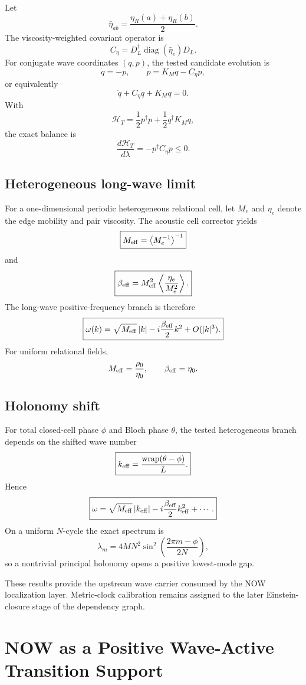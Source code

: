 \documentclass[11pt]{book}
\begin{document}
Let
\[
\bar\eta_{ab}=\frac{\eta_R(a)+\eta_R(b)}2.
\]
The viscosity-weighted covariant operator is
\[
\boxed{
C_\eta
=D_L^\dagger\operatorname{diag}(\bar\eta_e)D_L.
}
\]
For conjugate wave coordinates $(q,p)$, the tested candidate evolution is
\[
\dot q=-p,
\qquad
\dot p=K_Mq-C_\eta p,
\]
or equivalently
\[
\boxed{
\ddot q+C_\eta\dot q+K_Mq=0.
}
\]
With
\[
\mathcal H_T
=\frac12p^\dagger p+\frac12q^\dagger K_Mq,
\]
the exact balance is
\[
\boxed{
\frac{d\mathcal H_T}{d\lambda}
=-p^\dagger C_\eta p\le0.
}
\]

\section{Heterogeneous long-wave limit}

For a one-dimensional periodic heterogeneous relational cell, let $M_e$ and $\eta_e$ denote the edge mobility and pair viscosity.  The acoustic cell corrector yields
\[
\boxed{
M_{\rm eff}
=\left\langle M_e^{-1}\right\rangle^{-1}
}
\]
and
\[
\boxed{
\beta_{\rm eff}
=M_{\rm eff}^2
\left\langle\frac{\eta_e}{M_e^2}\right\rangle.
}
\]
The long-wave positive-frequency branch is therefore
\[
\boxed{
\omega(k)
=\sqrt{M_{\rm eff}}\,|k|
-i\frac{\beta_{\rm eff}}2k^2
+O(|k|^3).
}
\]
For uniform relational fields,
\[
M_{\rm eff}=\frac{\rho_0}{\eta_0},
\qquad
\beta_{\rm eff}=\eta_0.
\]

\section{Holonomy shift}

For total closed-cell phase $\phi$ and Bloch phase $\theta$, the tested heterogeneous branch depends on the shifted wave number
\[
\boxed{
k_{\rm eff}=\frac{\operatorname{wrap}(\theta-\phi)}{L}.
}
\]
Hence
\[
\boxed{
\omega
=\sqrt{M_{\rm eff}}\,|k_{\rm eff}|
-i\frac{\beta_{\rm eff}}2k_{\rm eff}^2+\cdots.
}
\]
On a uniform $N$-cycle the exact spectrum is
\[
\lambda_m
=4MN^2
\sin^2\!\left(\frac{2\pi m-\phi}{2N}\right),
\]
so a nontrivial principal holonomy opens a positive lowest-mode gap.

These results provide the upstream wave carrier consumed by the NOW localization layer.  Metric-clock calibration remains assigned to the later Einstein-closure stage of the dependency graph.

\chapter{NOW as a Positive Wave-Active Transition Support}
\end{document}
